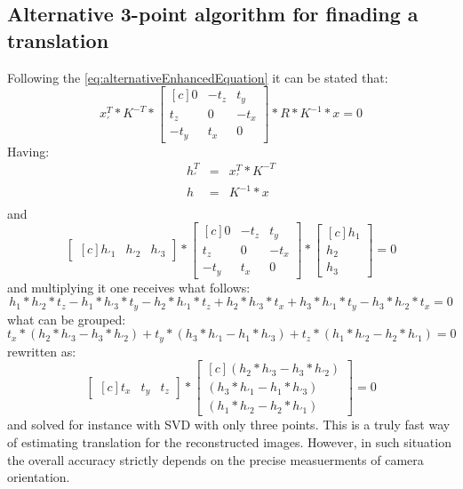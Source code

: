\subsection{Alternative 3-point algorithm for finading a translation}
Following the \ref{eq:alternativeEnhancedEquation} it can be stated that:
\begin{equation} \label{eq:alternative3point}
{x}_{'}^{T} * K^{-T} * \begin{bmatrix*}[c]
 0 & -t_{z} & t_{y}\\
 t_{z} & 0 & -t_{x}\\
-t_{y} & t_{x} & 0 
\end{bmatrix*} * R * K^{-1} * x = 0
\end{equation}
Having:
\begin{equation} \label{eq:leftRelative}
\begin{array}{lcl}
h_{'}^{T} &=& {x}_{'}^{T} * K^{-T} \\
h &=& K^{-1} * x \\
\end{array}
\end{equation}
and 
\begin{equation} \label{eq:alternative3point}
\begin{bmatrix*}[c]
h_{'1} & h_{'2} & h_{'3}
\end{bmatrix*}
* \begin{bmatrix*}[c]
 0 & -t_{z} & t_{y}\\
 t_{z} & 0 & -t_{x}\\
-t_{y} & t_{x} & 0 
\end{bmatrix*} 
* \begin{bmatrix*}[c]
h_{1} \\
h_{2} \\
h_{3}
\end{bmatrix*}
= 0
\end{equation}
and multiplying it one receives what follows:
\begin{equation} \label{eq:alternative3point}
h_{1}*h_{'2}*t_{z} - h_{1}*h_{'3}*t_{y} - h_{2}*h_{'1}*t_{z} + h_{2}*h_{'3}*t_{x} + h_{3}*h_{'1}*t_{y} - h_{3}*h_{'2}*t_{x}
= 0
\end{equation}
what can be grouped:
\begin{equation}
t_{x} * (h_{2}*h_{'3} - h_{3}*h_{'2}) + t_{y} * (h_{3}*h_{'1} - h_{1}*h_{'3}) + t_{z} * (h_{1}*h_{'2} - h_{2}*h_{'1}) = 0
\end{equation}
rewritten as:
\begin{equation} \label{eq:translation3point}
\begin{bmatrix*}[c]
t_{x} &
t_{y} &
t_{z}
\end{bmatrix*} * \begin{bmatrix*}[c]
(h_{2}*h_{'3} - h_{3}*h_{'2}) \\ 
(h_{3}*h_{'1} - h_{1}*h_{'3}) \\
(h_{1}*h_{'2} - h_{2}*h_{'1}) 
\end{bmatrix*} 
= 0
\end{equation}
and solved for instance with SVD with only three points. This is a truly fast way of estimating translation for the reconstructed images. However, in such situation the overall accuracy strictly depends on the precise measuerments of camera orientation.
